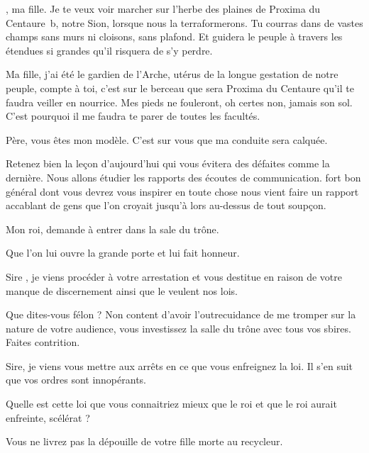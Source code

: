 \begin{drama}

  \roispeaks {} \princesse, ma fille. Je te veux voir marcher sur l’herbe des plaines de Proxima du Centaure~b, notre Sion, lorsque nous la terraformerons. Tu courras dans de vastes champs sans murs ni cloisons, sans plafond. Et guidera le peuple à travers les étendues si grandes qu’il risquera de s’y perdre.

  Ma fille, j’ai été le gardien de l’Arche, utérus de la longue gestation de notre peuple, compte à toi, c’est sur le berceau que sera Proxima du Centaure qu’il te faudra veiller en nourrice. Mes pieds ne fouleront, oh certes non, jamais son sol. C’est pourquoi il me faudra te parer de toutes les facultés.

  \elaspeaks Père, vous êtes mon modèle. C’est sur vous que ma conduite sera calquée.

  \roispeaks Retenez bien la leçon d’aujourd’hui qui vous évitera des défaites comme la dernière. Nous allons étudier les rapports des écoutes de communication. \general{} fort bon général dont vous devrez vous inspirer en toute chose nous vient faire un rapport accablant de gens que l’on croyait jusqu’à lors au-dessus de tout soupçon.

   Mon roi, \general demande à entrer dans la sale du trône.

  \roispeaks Que l’on lui ouvre la grande porte et lui fait honneur.



  \generalspeaks Sire \roi, je viens procéder à votre arrestation et vous destitue en raison de votre manque de discernement ainsi que le veulent nos lois.

  \roispeaks Que dites-vous félon ? Non content d’avoir l’outrecuidance de me tromper sur la nature de votre audience, vous investissez la salle du trône avec tous vos sbires. Faites contrition.

  \generalspeaks Sire, je viens vous mettre aux arrêts en ce que vous enfreignez la loi. Il s’en suit que vos ordres sont innopérants.

  \roispeaks Quelle est cette loi que vous connaitriez mieux que le roi et que le roi aurait enfreinte, scélérat ?

  \generalspeaks Vous ne livrez pas la dépouille de votre fille morte au recycleur.


\end{drama}
